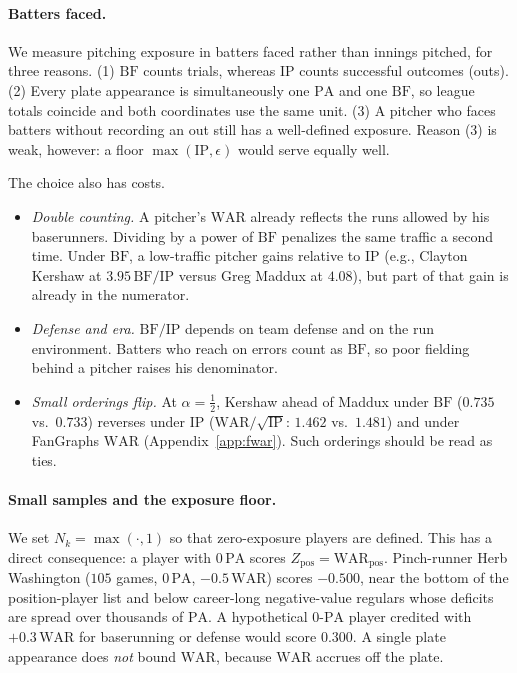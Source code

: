\documentclass[11pt,letterpaper]{article}
\theoremstyle{plain}
\theoremstyle{definition}
\theoremstyle{remark}
\newcommand{\WAR}{\mathrm{WAR}}
\newcommand{\PA}{\mathrm{PA}}
\newcommand{\BF}{\mathrm{BF}}
\newcommand{\IP}{\mathrm{IP}}
\newcommand{\Zpos}{Z_{\mathrm{pos}}}
\begin{document}
\paragraph{Batters faced.} We measure pitching exposure in batters faced rather than innings pitched, for three reasons. (1) $\BF$ counts trials, whereas $\IP$ counts successful outcomes (outs). (2) Every plate appearance is simultaneously one $\PA$ and one $\BF$, so league totals coincide and both coordinates use the same unit. (3) A pitcher who faces batters without recording an out still has a well-defined exposure. Reason (3) is weak, however: a floor $\max(\IP, \epsilon)$ would serve equally well.

The choice also has costs.
\begin{itemize}
    \item \emph{Double counting.} A pitcher's $\WAR$ already reflects the runs allowed by his baserunners. Dividing by a power of $\BF$ penalizes the same traffic a second time. Under $\BF$, a low-traffic pitcher gains relative to $\IP$ (e.g., Clayton Kershaw at $3.95\,\BF/\IP$ versus Greg Maddux at $4.08$), but part of that gain is already in the numerator.
    \item \emph{Defense and era.} $\BF/\IP$ depends on team defense and on the run environment. Batters who reach on errors count as $\BF$, so poor fielding behind a pitcher raises his denominator.
    \item \emph{Small orderings flip.} At $\alpha = \tfrac12$, Kershaw ahead of Maddux under $\BF$ ($0.735$ vs.\ $0.733$) reverses under $\IP$ ($\WAR/\sqrt{\IP}$: $1.462$ vs.\ $1.481$) and under FanGraphs $\WAR$ (Appendix~\ref{app:fwar}). Such orderings should be read as ties.
\end{itemize}

\paragraph{Small samples and the exposure floor.} We set $N_k = \max(\cdot, 1)$ so that zero-exposure players are defined. This has a direct consequence: a player with $0\,\PA$ scores $\Zpos = \WAR_{\mathrm{pos}}$. Pinch-runner Herb Washington ($105$ games, $0\,\PA$, $-0.5\,\WAR$) scores $-0.500$, near the bottom of the position-player list and below career-long negative-value regulars whose deficits are spread over thousands of $\PA$. A hypothetical $0$-$\PA$ player credited with $+0.3\,\WAR$ for baserunning or defense would score $0.300$. A single plate appearance does \emph{not} bound $\WAR$, because $\WAR$ accrues off the plate.
\end{document}
